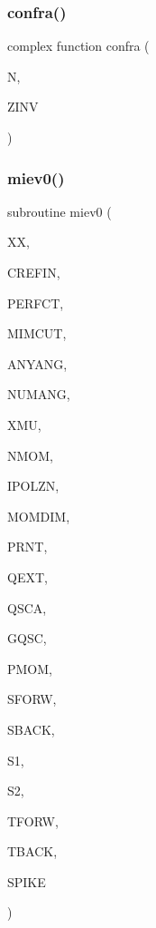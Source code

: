 \mbox{\label{_m_i_e_v0no_p_8f_ad91aace4d77229d367c28c78965a0bd5}} 
\subsubsection{\texorpdfstring{confra()}{confra()}}
{\footnotesize\ttfamily complex function confra (\begin{DoxyParamCaption}\item[{integer}]{N,  }\item[{complex}]{Z\+I\+NV }\end{DoxyParamCaption})}

\mbox{\label{_m_i_e_v0no_p_8f_a48092e733ab76cc9db0501ed3b28d9ff}} 
\subsubsection{\texorpdfstring{miev0()}{miev0()}}
{\footnotesize\ttfamily subroutine miev0 (\begin{DoxyParamCaption}\item[{real}]{XX,  }\item[{complex}]{C\+R\+E\+F\+IN,  }\item[{logical}]{P\+E\+R\+F\+CT,  }\item[{real}]{M\+I\+M\+C\+UT,  }\item[{logical}]{A\+N\+Y\+A\+NG,  }\item[{integer}]{N\+U\+M\+A\+NG,  }\item[{real, dimension($\ast$)}]{X\+MU,  }\item[{integer}]{N\+M\+OM,  }\item[{integer}]{I\+P\+O\+L\+ZN,  }\item[{integer}]{M\+O\+M\+D\+IM,  }\item[{logical, dimension($\ast$)}]{P\+R\+NT,  }\item[{real}]{Q\+E\+XT,  }\item[{real}]{Q\+S\+CA,  }\item[{real}]{G\+Q\+SC,  }\item[{real, dimension( 0\+:momdim, $\ast$ )}]{P\+M\+OM,  }\item[{complex}]{S\+F\+O\+RW,  }\item[{complex}]{S\+B\+A\+CK,  }\item[{complex, dimension($\ast$)}]{S1,  }\item[{complex, dimension($\ast$)}]{S2,  }\item[{complex, dimension($\ast$)}]{T\+F\+O\+RW,  }\item[{complex, dimension($\ast$)}]{T\+B\+A\+CK,  }\item[{real}]{S\+P\+I\+KE }\end{DoxyParamCaption})}

